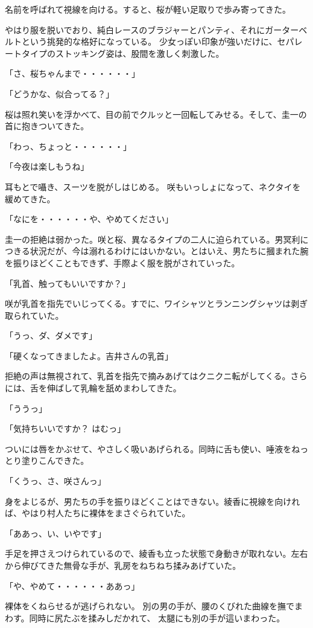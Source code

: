 ﻿\documentclass[book,tate]{jlreq}
\begin{document}
名前を呼ばれて視線を向ける。すると、桜が軽い足取りで歩み寄ってきた。

やはり服を脱いでおり、純白レースのブラジャーとパンティ、それにガーターベルトという挑発的な格好になっている。 少女っぽい印象が強いだけに、セパレートタイプのストッキング姿は、股間を激しく刺激した。

「さ、桜ちゃんまで・・・・・・」

「どうかな、似合ってる？」

桜は照れ笑いを浮かべて、目の前でクルッと一回転してみせる。そして、圭一の首に抱きついてきた。

「わっ、ちょっと・・・・・・」

「今夜は楽しもうね」

耳もとで囁き、スーツを脱がしはじめる。 咲もいっしょになって、ネクタイを緩めてきた。

「なにを・・・・・・や、やめてください」

圭一の拒絶は弱かった。咲と桜、異なるタイプの二人に迫られている。男冥利につきる状況だが、今は溺れるわけにはいかない。とはいえ、男たちに摑まれた腕を振りほどくこともできず、手際よく服を脱がされていった。

「乳首、触ってもいいですか？」

咲が乳首を指先でいじってくる。すでに、ワイシャツとランニングシャツは剥ぎ取られていた。

「うっ、ダ、ダメです」

「硬くなってきましたよ。吉井さんの乳首」

拒絶の声は無視されて、乳首を指先で摘みあげてはクニクニ転がしてくる。さらには、舌を伸ばして乳輪を舐めまわしてきた。

「ううっ」

「気持ちいいですか？ はむっ」

ついには唇をかぶせて、やさしく吸いあげられる。同時に舌も使い、唾液をねっとり塗りこんできた。

「くうっ、さ、咲さんっ」

身をよじるが、男たちの手を振りほどくことはできない。綾香に視線を向ければ、やはり村人たちに裸体をまさぐられていた。

「ああっ、い、いやです」

手足を押さえつけられているので、綾香も立った状態で身動きが取れない。左右から伸びてきた無骨な手が、乳房をねちねち揉みあげていた。

「や、やめて・・・・・・ああっ」

裸体をくねらせるが逃げられない。 別の男の手が、腰のくびれた曲線を撫でまわす。同時に尻たぶを揉みしだかれて、 太腿にも別の手が這いまわった。
\end{document}
